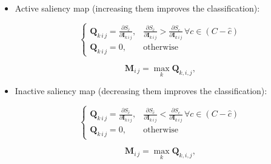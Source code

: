 \documentclass[preprint,12pt]{elsarticle}
\begin{document}
\begin{itemize}
    \item Active saliency map (increasing them improves the classification):
    
    \begin{equation}
        \begin{cases}
            \boldsymbol{Q}_{k\, i\, j} = \frac{\partial S_{\hat{c}}}{\partial \boldsymbol{I}_{k\, i\, j}},& \frac{\partial S_{\hat{c}}}{\partial \boldsymbol{I}_{k\, i\, j}} > \frac{\partial S_{c}}{\partial \boldsymbol{I}_{k\, i\, j}} \,\forall{c \in (C-\hat{c})}\\
            \boldsymbol{Q}_{k\, i\, j} = 0,& \text{otherwise}
        \end{cases}
        \label{eq: 2d active saliency map}
    \end{equation}

    \begin{equation}
        \boldsymbol{M}_{i\, j} = \max_{k} \boldsymbol{Q}_{k, i, j},
        \label{eq: 3d active saliency map}
    \end{equation}

    \item Inactive saliency map (decreasing them improves the classification):
    
    \begin{equation}
        \begin{cases}
            \boldsymbol{Q}_{k\, i\, j} = \frac{\partial S_{\hat{c}}}{\partial \boldsymbol{I}_{k\, i\, j}},& \frac{\partial S_{\hat{c}}}{\partial \boldsymbol{I}_{k\, i\, j}} < \frac{\partial S_{c}}{\partial \boldsymbol{I}_{k\, i\, j}} \,\forall{c \in (C-\hat{c})}\\
            \boldsymbol{Q}_{k\, i\, j} = 0,& \text{otherwise}
        \end{cases}
        \label{eq: 2d inactive saliency map}
    \end{equation}

    \begin{equation}
        \boldsymbol{M}_{i\, j} = \max_{k} \boldsymbol{Q}_{k, i, j},
        \label{eq: 3d inactive saliency map}
    \end{equation}

\end{itemize}
\end{document}
